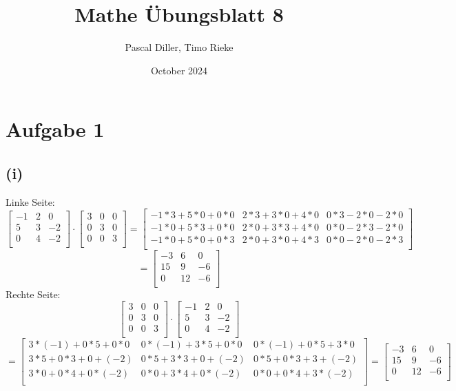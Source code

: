 \documentclass{article}
\title{Mathe Übungsblatt 8}
\author{Pascal Diller, Timo Rieke}
\date{October 2024}
\begin{document}
\maketitle

\section{Aufgabe 1}
\subsection{(i)}
Linke Seite:
\[
\begin{bmatrix}
-1 & 2 & 0 \\
5 & 3 & -2 \\
0 & 4 & -2 \\
\end{bmatrix} \cdot 
\begin{bmatrix}
    3 & 0 & 0\\
    0 & 3 & 0 \\
    0 & 0 &3\\
\end{bmatrix} = 
\begin{bmatrix}
    -1*3+5*0+0*0 & 2*3+3*0+4*0 & 0*3-2*0-2*0\\
    -1*0+5*3+0*0 & 2*0+3*3+4*0 & 0*0-2*3-2*0\\
    -1*0+5*0+0*3 & 2*0+3*0+4*3 & 0*0-2*0-2*3\\
\end{bmatrix}\]  \[ =
\begin{bmatrix}
    -3 & 6 & 0\\
    15 & 9 & -6\\
    0 & 12 & -6\\
\end{bmatrix}
\]
Rechte Seite:
\[
\begin{bmatrix}
    3 & 0 & 0\\
    0 & 3 & 0 \\
    0 & 0 &3\\
\end{bmatrix} \cdot 
\begin{bmatrix}
-1 & 2 & 0 \\
5 & 3 & -2 \\
0 & 4 & -2 \\
\end{bmatrix}\]  \[ = 
\begin{bmatrix}
3*(-1) + 0*5 +0*0& 0*(-1) + 3*5 +0*0 & 0*(-1) + 0*5 +3*0\\
3*5+0*3+0+(-2)&0*5+3*3+0+(-2)& 0*5+0*3+3+(-2) \\
3*0+0*4+0*(-2)& 0*0+3*4+0*(-2) & 0*0+0*4+3*(-2)\\
\end{bmatrix} =
\begin{bmatrix}
    -3 & 6 & 0\\
    15 & 9 & -6\\
    0 & 12 & -6\\
\end{bmatrix}
\]
\end{document}
